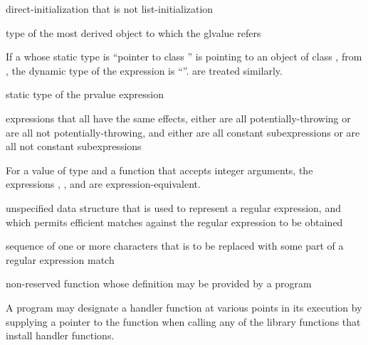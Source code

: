%
direct-initialization
that is not list-initialization

%
 type of the most derived object to which the
glvalue refers

\begin{example}
If a   whose static type is ``pointer to
class '' is pointing to an object of class ,
from , the dynamic type of the
expression  is ``''.  are
treated similarly.
\end{example}

%
 static type of the prvalue expression

%
expressions that all have the same effects,
either
are all potentially-throwing or
are all not potentially-throwing,
and
either
are all constant subexpressions or
are all not constant subexpressions

\begin{example}
For a value  of type 
and a function  that accepts integer arguments,
the expressions
,
,
and
are expression-equivalent.
\end{example}

%
unspecified data structure that is used to
represent a regular expression, and which permits efficient matches
against the regular expression to be obtained

%
sequence of one or more characters that is to be
replaced with some part of a regular expression match

%
non-reserved function whose definition may be provided by a \Cpp{} program

\begin{defnote}
A \Cpp{} program may designate a handler function at various points in its execution by
supplying a pointer to the function when calling any of the library functions that install
handler functions.
\end{defnote}

